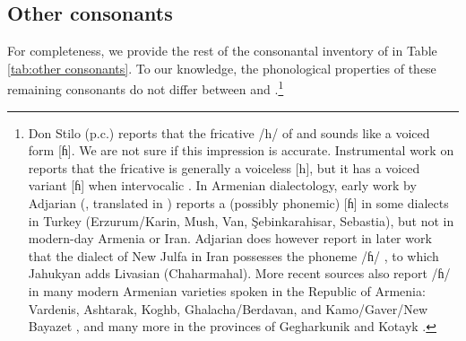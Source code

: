 \subsection{Other consonants}\label{section:phono:segmental:other cons}\largerpage
For completeness, we provide the rest of the consonantal inventory of {\iaIA} in Table \ref{tab:other consonants}. To our knowledge, the phonological properties of these remaining consonants do not differ between {\seaSE} and {\iaIA}.\footnote{%
	Don Stilo (p.c.) reports that the fricative /h/ of {\seaAbbre} and {\iaAbbre} sounds like a voiced form [ɦ]. We are not sure if this impression is accurate. Instrumental work on {\seaAbbre} reports that the fricative is generally a voiceless [h], but it has a voiced variant [ɦ] when intervocalic \citep[182--184]{Khachatryan-1988-ArmenianPhono}. In Armenian dialectology, early work by Adjarian (\citealt{Adjarian-1911-DialectologyBook}, translated in \citealt{Dolatian-prep-Adjarian}) reports a (possibly phonemic) [ɦ] in some dialects in Turkey (Erzurum/Karin, Mush, Van, Şebinkarahisar, Sebastia), but not in modern-day Armenia or Iran. Adjarian does however report in later work that the dialect of New Julfa in Iran possesses the phoneme /ɦ/   \citep[\S 5]{Adjarian-1940-NewJulfaDialect},   to which Jahukyan \citep[60]{Jahukyan-1972-ArmenianDiaolectology} adds Livasian (Chaharmahal). More recent sources also report /ɦ/ in many modern Armenian varieties spoken in the Republic of Armenia: Vardenis, Ashtarak, Koghb, Ghalacha/Berdavan, and Kamo/Gaver/New Bayazet \citep[58--59]{Jahukyan-1972-ArmenianDiaolectology}, and many more in the provinces of Gegharkunik  \citep{Katvlaryan-2018-ArmenianRepublicDialectChar1Geghargunik}  and Kotayk \citep{Katvalyan-2020-DialectBook}. 
}


